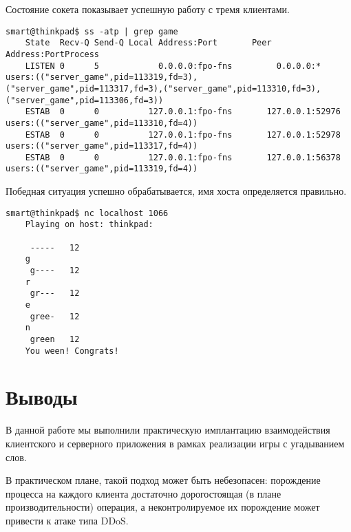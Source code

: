 Состояние сокета показывает успешную работу с тремя клиентами.
\begin{Verbatim}[frame=single]
    smart@thinkpad$ ss -atp | grep game
    State  Recv-Q Send-Q Local Address:Port       Peer Address:PortProcess
    LISTEN 0      5            0.0.0.0:fpo-fns         0.0.0.0:*           users:(("server_game",pid=113319,fd=3),("server_game",pid=113317,fd=3),("server_game",pid=113310,fd=3),("server_game",pid=113306,fd=3))
    ESTAB  0      0          127.0.0.1:fpo-fns       127.0.0.1:52976       users:(("server_game",pid=113310,fd=4))                                                                                                
    ESTAB  0      0          127.0.0.1:fpo-fns       127.0.0.1:52978       users:(("server_game",pid=113317,fd=4))                                                                                                
    ESTAB  0      0          127.0.0.1:fpo-fns       127.0.0.1:56378       users:(("server_game",pid=113319,fd=4))
\end{Verbatim}

Победная ситуация успешно обрабатывается, имя хоста определяется правильно.
\begin{Verbatim}[frame=single]
    smart@thinkpad$ nc localhost 1066
    Playing on host: thinkpad:
    
     -----   12
    g
     g----   12
    r
     gr---   12
    e
     gree-   12
    n
     green   12
    You ween! Congrats!
\end{Verbatim}

\section*{Выводы}

В данной работе мы выполнили практическую имплантацию взаимодействия клиентского и серверного приложения в рамках реализации игры с угадыванием слов.

В практическом плане, такой подход может быть небезопасен: порождение процесса на каждого клиента достаточно дорогостоящая (в плане производительности) операция, а неконтролируемое их порождение может привести к атаке типа DDoS.
